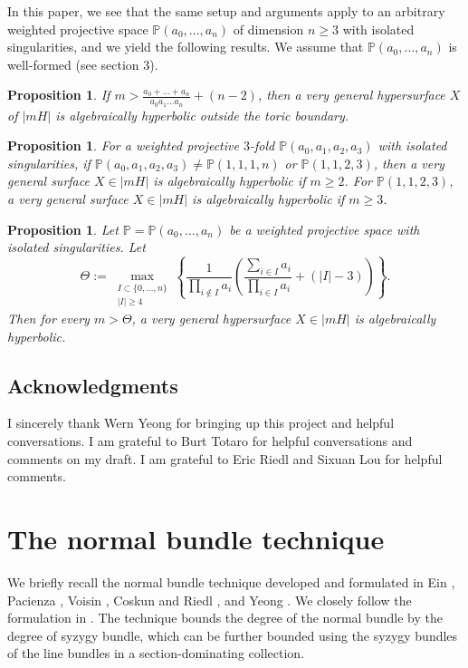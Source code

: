 \documentclass{amsart}
\newtheorem{proposition}[theorem]{Proposition}
\theoremstyle{definition}
\theoremstyle{remark}
\begin{document}
In this paper, we see that the same setup and arguments apply to an arbitrary weighted projective space $\mathbb P(a_0,...,a_n)$ of dimension $n\geq 3$ with isolated singularities, and we yield the following results. We assume that $\mathbb P(a_0,...,a_n)$ is well-formed (see section 3).
\begin{proposition}
If $m > \frac{a_0 + \dots + a_n}{a_0a_1... a_n} + (n-2)$, then a very general hypersurface $X$ of $|mH|$ is algebraically hyperbolic outside the toric boundary.
\end{proposition}
\begin{proposition}
For a weighted projective $3$-fold $\mathbb{P}(a_0,a_1,a_2,a_3)$ with isolated singularities, if $\mathbb{P}(a_0,a_1,a_2,a_3) \neq \mathbb{P}(1,1,1,n)$ or $\mathbb{P}(1,1,2,3)$, then a very general surface $X\in |mH|$ is algebraically hyperbolic if $m \geq 2$. For $\mathbb{P}(1,1,2,3)$, a very general surface $X\in|mH|$ is algebraically hyperbolic if $m\geq 3$.
\end{proposition}
\begin{proposition}
Let $\mathbb{P} = \mathbb{P}(a_0,\dots,a_n)$ be a weighted projective space with isolated singularities. Let
\[
\Theta := \max_{\substack{I \subset \{0,\dots,n\} \\ |I|\ge 4}} \left\{\frac1{\prod_{i\notin I}a_i} \left( \frac{\sum_{i \in I} a_i}{\prod_{i\in I} a_i} + (|I|-3) \right)\right\}.
\]
Then for every $m > \Theta$, a very general hypersurface $X \in |mH|$ is algebraically hyperbolic.
\end{proposition}

\subsection*{Acknowledgments}
I sincerely thank Wern Yeong for bringing up this project and helpful conversations. I am grateful to Burt Totaro for helpful conversations and comments on my draft. I am grateful to Eric Riedl and Sixuan Lou for helpful comments.

\section{The normal bundle technique}

We briefly recall the normal bundle technique developed and formulated in Ein \cite{Ein1988, Ein1991}, Pacienza \cite{Pacienza2003}, Voisin \cite{Voisin1996, Voisin1998}, Coskun and Riedl \cite{CoskunRiedl2019,coskun2019algebraichyperbolicitygeneralsurfaces}, and Yeong \cite{yeong2022algebraichyperbolicitygeneralhypersurfaces}. We closely follow the formulation in \cite{coskun2019algebraichyperbolicitygeneralsurfaces}. The technique bounds the degree of the normal bundle by the degree of syzygy bundle, which can be further bounded using the syzygy bundles of the line bundles in a section-dominating collection.
\end{document}
